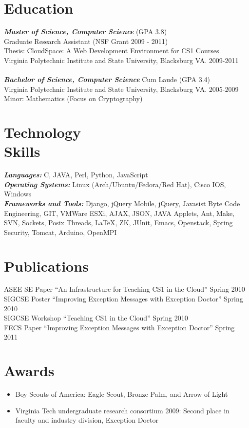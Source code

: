 \documentclass[line,margin]{res}
\begin{document}
\begin{resume}
 
\section{Education} 
        \textbf{\emph{Master of Science, Computer Science}} (GPA 3.8) \\
        Graduate Research Assistant (NSF Grant 2009 - 2011) \\
        Thesis:  CloudSpace: A Web Development Environment for CS1 Courses \\
        Virginia Polytechnic Institute and State University, Blacksburg VA. 2009-2011 \\
\\[-5pt]
        \textbf{\emph{Bachelor of Science, Computer Science}} Cum Laude (GPA 3.4) \\
        Virginia Polytechnic Institute and State University, Blacksburg VA. 2005-2009 \\
        Minor: Mathematics (Focus on Cryptography)

\section{Technology \\ Skills} \textbf{\emph{Languages:}} C, JAVA, Perl, Python, JavaScript \\
                \textbf{\emph{Operating Systems:}} Linux (Arch/Ubuntu/Fedora/Red Hat), Cisco IOS, Windows \\
                \textbf{\emph{Frameworks and Tools:}} Django, jQuery Mobile, jQuery, Javasist Byte Code Engineering, GIT, VMWare ESXi, AJAX, JSON, JAVA Applets, Ant, Make, SVN, Sockets, Posix Threads, \LaTeX, ZK, JUnit, Emacs, Openstack, Spring Security, Tomcat, Arduino, OpenMPI \\

\section{Publications}
ASEE SE Paper ``An Infrastructure for Teaching CS1 in the Cloud'' Spring 2010 \\
SIGCSE Poster ``Improving Exception Messages with Exception Doctor'' Spring 2010 \\
SIGCSE Workshop ``Teaching CS1 in the Cloud'' Spring 2010 \\
FECS Paper ``Improving Exception Messages with Exception Doctor'' Spring 2011

\section{Awards}
\begin{itemize}  \itemsep -2pt %
\item Boy Scouts of America: Eagle Scout, Bronze Palm, and Arrow of Light
\item Virginia Tech undergraduate research consortium 2009:  Second place in faculty and industry division, Exception Doctor
\end{itemize}
\end{resume}
\end{document}
